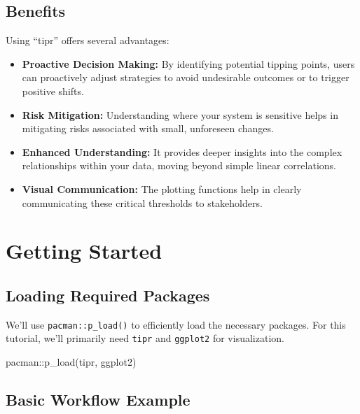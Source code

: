 \documentclass[
  10pt,
  letterpaper,
  DIV=11,
  numbers=noendperiod]{scrartcl}
\newenvironment{Shaded}{\begin{snugshade}}{\end{snugshade}}
\newcommand{\FunctionTok}[1]{\textcolor[rgb]{0.28,0.35,0.67}{#1}}
\newcommand{\NormalTok}[1]{\textcolor[rgb]{0.00,0.23,0.31}{#1}}
\newcommand{\SpecialCharTok}[1]{\textcolor[rgb]{0.37,0.37,0.37}{#1}}
\providecommand{\tightlist}{%
  \setlength{\itemsep}{0pt}\setlength{\parskip}{0pt}}
\begin{document}
\subsection{Benefits}\label{benefits}

Using ``tipr'' offers several advantages:

\begin{itemize}
\tightlist
\item
  \textbf{Proactive Decision Making:} By identifying potential tipping
  points, users can proactively adjust strategies to avoid undesirable
  outcomes or to trigger positive shifts.
\item
  \textbf{Risk Mitigation:} Understanding where your system is sensitive
  helps in mitigating risks associated with small, unforeseen changes.
\item
  \textbf{Enhanced Understanding:} It provides deeper insights into the
  complex relationships within your data, moving beyond simple linear
  correlations.
\item
  \textbf{Visual Communication:} The plotting functions help in clearly
  communicating these critical thresholds to stakeholders.
\end{itemize}

\section{Getting Started}\label{getting-started}

\subsection{Loading Required Packages}\label{loading-required-packages}

We'll use \texttt{pacman::p\_load()} to efficiently load the necessary
packages. For this tutorial, we'll primarily need \texttt{tipr} and
\texttt{ggplot2} for visualization.

\begin{Shaded}
\begin{Highlighting}[]
\NormalTok{pacman}\SpecialCharTok{::}\FunctionTok{p\_load}\NormalTok{(tipr, ggplot2)}
\end{Highlighting}
\end{Shaded}

\subsection{Basic Workflow Example}\label{basic-workflow-example}
\end{document}

